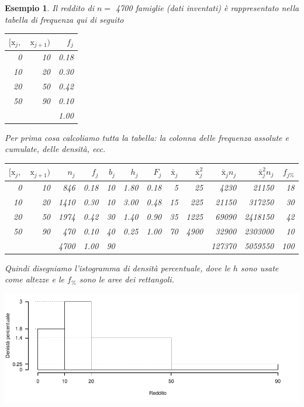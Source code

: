 \documentclass[
  11pt,
]{book}
\theoremstyle{mytheoremstyle}
\theoremstyle{mydefstyle}
\newtheorem{example}{{Esempio}}[section]
\begin{document}
\begin{example}

Il reddito di \(n=\) 4700 famiglie (dati inventati)
è rappresentato nella tabella di frequenza qui di seguito

\begin{tabular}{rrr}
\toprule
$[\text{x}_j,$ & $\text{x}_{j+1})$ & $f_j$\\
\midrule
0 & 10 & 0.18\\
10 & 20 & 0.30\\
20 & 50 & 0.42\\
50 & 90 & 0.10\\
 &  & 1.00\\
\bottomrule
\end{tabular}

Per prima cosa calcoliamo tutta la tabella: la colonna delle frequenza assolute e cumulate, delle densità, ecc.

\begin{tabular}{rrrrrrrrrrrr}
\toprule
$[\text{x}_j,$ & $\text{x}_{j+1})$ & $n_j$ & $f_j$ & $b_j$ & $h_j$ & $F_j$ & $\bar{\text{x}}_j$ & $\bar{\text{x}}_j^2$ & $\bar{\text{x}}_jn_j$ & $\bar{\text{x}}_j^2 n_j$ & $f_{j\%}$\\
\midrule
0 & 10 & 846 & 0.18 & 10 & 1.80 & 0.18 & 5 & 25 & 4230 & 21150 & 18\\
10 & 20 & 1410 & 0.30 & 10 & 3.00 & 0.48 & 15 & 225 & 21150 & 317250 & 30\\
20 & 50 & 1974 & 0.42 & 30 & 1.40 & 0.90 & 35 & 1225 & 69090 & 2418150 & 42\\
50 & 90 & 470 & 0.10 & 40 & 0.25 & 1.00 & 70 & 4900 & 32900 & 2303000 & 10\\
 &  & 4700 & 1.00 & 90 &  &  &  &  & 127370 & 5059550 & 100\\
\bottomrule
\end{tabular}

Quindi disegniamo l'istogramma di densità percentuale, dove le \(h\) sono usate come altezze e le \(f_{\%}\) sono le aree dei rettangoli.

\begin{center}\includegraphics{Appunti_di_Statistica_2025_files/figure-latex/04a-Istogramma-2-1} \end{center}


\end{example}
\end{document}
